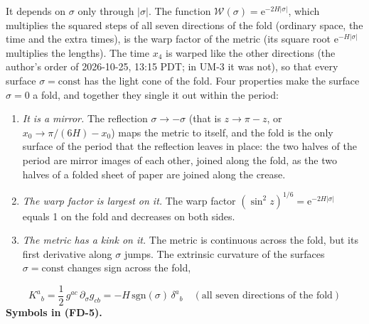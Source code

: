 \documentclass[
  10pt,
]{article}
\providecommand{\tightlist}{%
  \setlength{\itemsep}{0pt}\setlength{\parskip}{0pt}}
\begin{document}
It depends on \(\sigma\) only through \(\lvert\sigma\rvert\). The
function \(\mathcal{W}(\sigma) = \mathrm{e}^{-2H\lvert\sigma\rvert}\),
which multiplies the squared steps of all seven directions of the fold
(ordinary space, the time and the extra times), is the warp factor of
the metric (its square root \(\mathrm{e}^{-H\lvert\sigma\rvert}\)
multiplies the lengths). The time \(x_4\) is warped like the other
directions (the author's order of 2026-10-25, 13:15 PDT; in UM-3 it was
not), so that every surface \(\sigma = \text{const}\) has the light cone
of the fold. Four properties make the surface \(\sigma = 0\) a fold, and
together they single it out within the period:

\begin{enumerate}
\def\labelenumi{\arabic{enumi}.}
\tightlist
\item
  \emph{It is a mirror.} The reflection \(\sigma \to -\sigma\) (that is
  \(z \to \pi - z\), or \(x_0 \to \pi/(6H) - x_0\)) maps the metric to
  itself, and the fold is the only surface of the period that the
  reflection leaves in place: the two halves of the period are mirror
  images of each other, joined along the fold, as the two halves of a
  folded sheet of paper are joined along the crease.
\item
  \emph{The warp factor is largest on it.} The warp factor
  \((\sin^2z)^{1/6} = \mathrm{e}^{-2H\lvert\sigma\rvert}\) equals 1 on
  the fold and decreases on both sides.
\item
  \emph{The metric has a kink on it.} The metric is continuous across
  the fold, but its first derivative along \(\sigma\) jumps. The
  extrinsic curvature of the surfaces \(\sigma = \text{const}\) changes
  sign across the fold,
\end{enumerate}

\[
K^a{}_b = \frac12\,g^{ac}\,\partial_\sigma g_{cb} = -H\,\mathrm{sgn}(\sigma)\,\delta^a{}_b\quad(\text{all seven directions of the fold}) \tag{FD-5}
\] \textbf{Symbols in (FD-5).}
\end{document}
